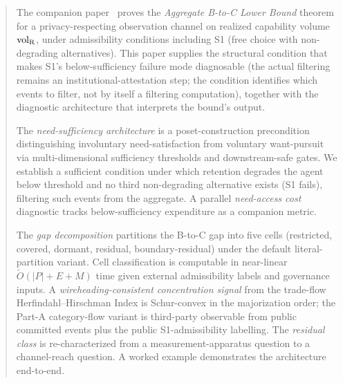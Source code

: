 \begin{abstract}
The companion paper~\citep[Revealed~Sacrifice]{lasser2026paper8a} proves the
    \emph{Aggregate B-to-C Lower Bound} theorem for a privacy-respecting
    observation channel on realized capability volume $\volR$, under
    admissibility conditions including S1 (free choice with non-degrading
    alternatives).  This paper supplies the structural condition that makes
    S1's below-sufficiency failure mode diagnosable (the actual filtering
    remains an institutional-attestation step; the condition identifies which
    events to filter, not by itself a filtering computation), together with the
    diagnostic architecture that interprets the bound's output.

The \emph{need-sufficiency architecture} is a poset-construction precondition
    distinguishing involuntary need-satisfaction from voluntary want-pursuit
    via multi-dimensional sufficiency thresholds and downstream-safe gates.  We
    establish a sufficient condition under which retention degrades the agent
    below threshold and no third non-degrading alternative exists (S1 fails),
    filtering such events from the aggregate. A parallel \emph{need-access cost}
    diagnostic tracks below-sufficiency expenditure as a companion metric.

The \emph{gap decomposition} partitions the B-to-C gap into five cells
    (restricted, covered, dormant, residual, boundary-residual) under the
    default literal-partition variant. Cell classification is computable in
    near-linear $\widetilde{O}(|P|+E+M)$ time given external admissibility
    labels and governance inputs.  A \emph{wireheading-consistent concentration
    signal} from the trade-flow Herfindahl--Hirschman Index is Schur-convex in
    the majorization order; the Part-A category-flow variant is third-party
    observable from public committed events plus the public
    S1-admissibility labelling.  The \emph{residual class} is
    re-characterized from a measurement-apparatus question to a channel-reach
    question. A worked example demonstrates the architecture end-to-end.
\end{abstract}
